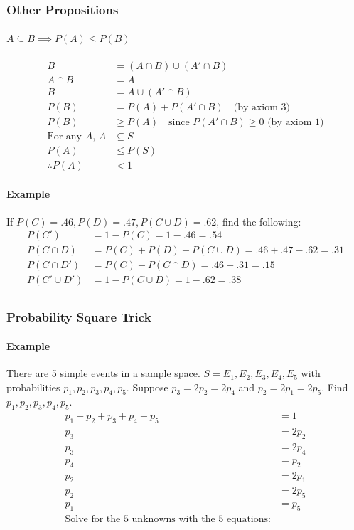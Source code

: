 \subsubsection*{Other Propositions}

\paragraph*{$A \subseteq B \implies P(A) \leq P(B)$}
\begin{align*}
    B &= (A \cap B) \cup (A' \cap B) \\
    A \cap B &= A \\
    B &= A \cup (A' \cap B) \\
    P(B) &= P(A) + P(A' \cap B) \quad \text{(by axiom 3)} \\
    P(B) &\geq P(A) \quad \text{since } P(A' \cap B) \geq 0 \text{ (by axiom 1)} \\
    \text{For any } A,\, A &\subseteq S \\
    P(A) &\leq P(S) \\
    \therefore P(A) &< 1
\end{align*}

\paragraph*{Example}
If $P(C) = .46, P(D) = .47, P(C \cup D) = .62$, find the following:
\begin{align*}
    P(C') &= 1 - P(C) = 1 - .46 = .54 \\
    P(C \cap D) &= P(C) + P(D) - P(C \cup D) = .46 + .47 - .62 = .31 \\
    P(C \cap D') &= P(C) - P(C \cap D) = .46 - .31 = .15 \\
    P(C' \cup D') &= 1 - P(C \cup D) = 1 - .62 = .38 \\
\end{align*}

\subsubsection*{Probability Square Trick}

\paragraph*{Example}
There are 5 simple events in a sample space. $S = {E_1, E_2, E_3, E_4, E_5}$ with
probabilities $p_1, p_2, p_3, p_4, p_5$. Suppose $p_3 = 2p_2 = 2 p_4$ and $p_2 = 2p_1 = 2p_5$.
Find $p_1, p_2, p_3, p_4, p_5$.
\begin{align*}
    p_1 + p_2 + p_3 + p_4 + p_5 &= 1 \\
    p_3 &= 2p_2 \\
    p_3 &= 2p_4\\
    p_4 &= p_2 \\
    p_2 &= 2p_1 \\
    p_2 &= 2p_5 \\
    p_1 &= p_5 \\
    \text{Solve for the 5 unknowns with the 5 equations:}
\end{align*}